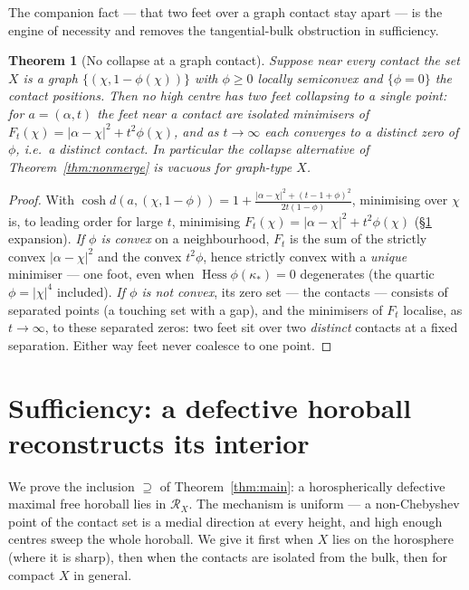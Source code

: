\documentclass[11pt]{article}
\newtheorem{theorem}{Theorem}[section]
\theoremstyle{remark}
\newcommand{\X}{X}
\newcommand{\Rx}{\mathcal{R}_{\X}}
\begin{document}
The companion fact --- that two feet over a graph
contact stay apart --- is the engine of necessity and removes the
tangential-bulk obstruction in sufficiency.

\begin{theorem}[No collapse at a graph contact]\label{thm:nocollapse}
Suppose near every contact the set $\X$ is a graph
$\{(\chi,1-\phi(\chi))\}$ with $\phi\ge0$ locally semiconvex and
$\{\phi=0\}$ the contact positions. Then no high centre has two feet
collapsing to a single point: for $a=(\alpha,t)$ the feet near a
contact are isolated minimisers of
$F_{t}(\chi)=\lvert\alpha-\chi\rvert^{2}+t^{2}\phi(\chi)$, and as
$t\to\infty$ each converges to a \emph{distinct} zero of $\phi$, i.e.\
a distinct contact. In particular the collapse alternative of
Theorem~\ref{thm:nonmerge} is vacuous for graph-type $\X$.
\end{theorem}

\begin{proof}
With $\cosh d(a,(\chi,1-\phi))=1+\frac{\lvert\alpha-\chi\rvert^{2}
+(t-1+\phi)^{2}}{2t(1-\phi)}$, minimising over $\chi$ is, to leading
order for large $t$, minimising
$F_{t}(\chi)=\lvert\alpha-\chi\rvert^{2}+t^{2}\phi(\chi)$
(\S\ref{thm:nocollapse} expansion). \emph{If $\phi$ is convex} on a
neighbourhood, $F_{t}$ is the sum of the strictly convex
$\lvert\alpha-\chi\rvert^{2}$ and the convex $t^{2}\phi$, hence
strictly convex with a \emph{unique} minimiser --- one foot, even
when $\operatorname{Hess}\phi(\kappa_{\ast})=0$ degenerates (the
quartic $\phi=\lvert\chi\rvert^{4}$ included). \emph{If $\phi$ is not
convex}, its zero set --- the contacts --- consists of separated
points (a touching set with a gap), and the minimisers of $F_{t}$
localise, as $t\to\infty$, to these separated zeros: two feet sit over
two \emph{distinct} contacts at a fixed separation. Either way feet
never coalesce to one point.
\end{proof}

\section{Sufficiency: a defective horoball reconstructs its interior}\label{sec:suff-main}

We prove the inclusion $\supseteq$ of
Theorem~\ref{thm:main}: a horospherically defective maximal free horoball
lies in $\Rx$. The mechanism is uniform --- a non-Chebyshev point of the
contact set is a medial direction at every height, and high enough
centres sweep the whole horoball. We give it first when $\X$ lies on the
horosphere (where it is sharp), then when the contacts are isolated from
the bulk, then for compact $\X$ in general.
\end{document}
